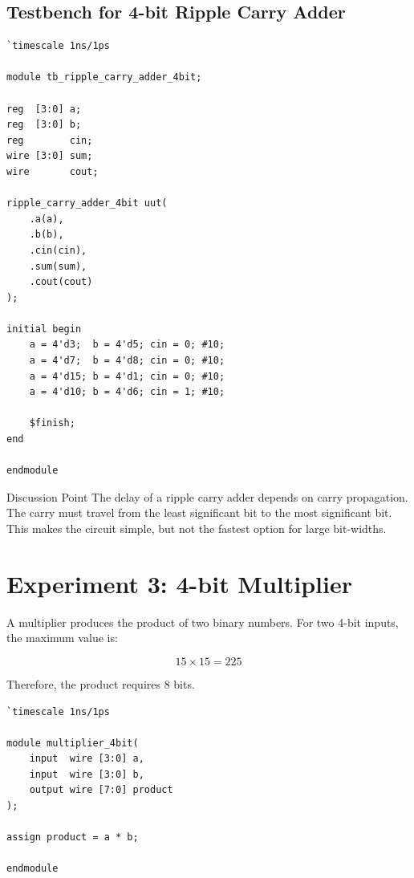\documentclass[11pt,a4paper]{article}
\begin{document}
\subsection{Testbench for 4-bit Ripple Carry Adder}

\begin{lstlisting}[caption={Testbench for 4-bit ripple carry adder}]
`timescale 1ns/1ps

module tb_ripple_carry_adder_4bit;

reg  [3:0] a;
reg  [3:0] b;
reg        cin;
wire [3:0] sum;
wire       cout;

ripple_carry_adder_4bit uut(
    .a(a),
    .b(b),
    .cin(cin),
    .sum(sum),
    .cout(cout)
);

initial begin
    a = 4'd3;  b = 4'd5; cin = 0; #10;
    a = 4'd7;  b = 4'd8; cin = 0; #10;
    a = 4'd15; b = 4'd1; cin = 0; #10;
    a = 4'd10; b = 4'd6; cin = 1; #10;

    $finish;
end

endmodule
\end{lstlisting}

\begin{conceptbox}{Discussion Point}
The delay of a ripple carry adder depends on carry propagation. The carry must travel from the least significant bit to the most significant bit. This makes the circuit simple, but not the fastest option for large bit-widths.
\end{conceptbox}

\section{Experiment 3: 4-bit Multiplier}

A multiplier produces the product of two binary numbers. For two 4-bit inputs, the maximum value is:

$$ 15 \times 15 = 225 $$

Therefore, the product requires 8 bits.

\begin{lstlisting}[caption={4-bit combinational multiplier}]
`timescale 1ns/1ps

module multiplier_4bit(
    input  wire [3:0] a,
    input  wire [3:0] b,
    output wire [7:0] product
);

assign product = a * b;

endmodule
\end{lstlisting}
\end{document}
